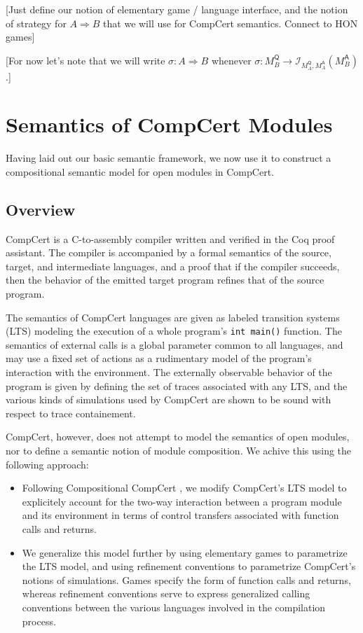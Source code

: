 \documentclass[acmsmall,timestamp,review]{acmart}
\newcommand{\kw}[1]{\ensuremath{ \mathsf{#1} }}
\begin{document}
[Just define our notion of elementary game / language interface,
and the notion of strategy for $A \Rightarrow B$
that we will use for CompCert semantics.
Connect to HON games]

[For now let's note that we will write $\sigma : A \Rightarrow B$
whenever
$\sigma : M_B^\kw{Q} \rightarrow
\mathcal{I}_{M_A^\kw{Q}, M_A^\kw{A}}(M_B^\kw{A})$.]



\section{Semantics of CompCert Modules} \label{sec:modsem} %


Having laid out our basic semantic framework,
we now use it to construct a compositional semantic model
for open modules in CompCert.


\subsection{Overview} %

CompCert is a C-to-assembly compiler written and verified
in the Coq proof assistant.
The compiler is accompanied by
a formal semantics of the source, target, and intermediate languages,
and a proof that if the compiler succeeds,
then the behavior of the emitted target program
refines that of the source program.

The semantics of CompCert languages
are given as labeled transition systems (LTS)
modeling the execution of a whole program's \texttt{int main()} function.
The semantics of external calls
is a global parameter common to all languages,
and may use a fixed set of actions as a rudimentary model
of the program's interaction with the environment.
The externally observable behavior of the program
is given by defining the set of traces associated with any LTS,
and the various kinds of simulations used by CompCert
are shown to be sound with respect to trace containement.

CompCert, however,
does not attempt to model the semantics of open modules,
nor to define a semantic notion of module composition.
We achive this using the following approach:
\begin{itemize}
\item Following Compositional CompCert \cite{compcompcert},
  we modify CompCert's LTS model
  to explicitely account for the two-way interaction
  between a program module and its environment
  in terms of control transfers associated with
  function calls and returns.
\item We generalize this model further by
  using elementary games to parametrize the LTS model, and
  using refinement conventions to parametrize
  CompCert's notions of simulations.
  Games specify the form of function calls and returns,
  whereas refinement conventions serve to express
  generalized calling conventions between the various
  languages involved in the compilation process.
\end{itemize}
\end{document}

